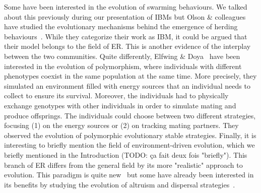         Some have been interested in the evolution of swarming behaviours. We talked about this previously during our presentation of IBMs but Olson \& colleagues have studied the evolutionary mechanisms behind the emergence of herding behaviours~\parencite{Olson2013, Olson2013a, Haley2014}. While they categorize their work as IBM, it could be argued that their model belongs to the field of ER. This is another evidence of the interplay between the two communities. Quite differently, Elfwing \& Doya~\parencite{Elfwing2014a} have been interested in the evolution of polymorphism, where individuals with different phenotypes coexist in the same population at the same time. More precisely, they simulated an environment filled with energy sources that an individual needs to collect to ensure its survival. Moreover, the individuals had to physically exchange genotypes with other individuals in order to simulate mating and produce offsprings. The individuals could choose between two different strategies, focusing (1) on the energy sources or (2) on tracking mating partners. They observed the evolution of polymorphic evolutionary stable strategies. Finally, it is interesting to briefly mention the field of environment-driven evolution, which we briefly mentioned in the Introduction (TODO: ça fait deux fois "briefly"). This branch of ER differs from the general field by its more "realistic" approach to evolution. This paradigm is quite new~\parencite{Bredeche2010, Bredeche2012} but some have already been interested in its benefits by studying the evolution of altruism and dispersal strategies~\parencite{Montanier2011, Montanier2013}.

